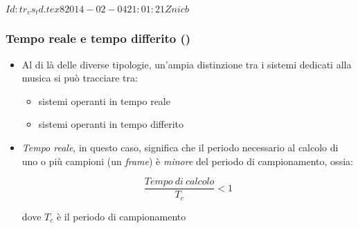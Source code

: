 %
%
%
%
%
\svnInfo $Id: tr_vs_td.tex 8 2014-02-04 21:01:21Z nicb $

\setcounter{ms}{0}
\begin{frame}
    \frametitle{Tempo reale e tempo differito ()}

	\begin{itemize}[<+- | alert@+->]

		\item Al di l\`a delle diverse tipologie,
		      un'ampia distinzione tra i sistemi dedicati alla musica
              si pu\`o tracciare tra:

			  \begin{itemize}[<+- | alert@+->]

				\item sistemi operanti in tempo reale

				\item sistemi operanti in tempo differito

			  \end{itemize}

		\item \emph{Tempo reale}, in questo caso, significa che
			  il periodo necessario al calcolo di uno o pi\`u campioni
			  (un \emph{frame}) \`e \emph{minore} del periodo di campionamento,
			  ossia:

			  \begin{equation}
				\frac{Tempo~di~calcolo}{T_c} < 1 \nonumber
			  \end{equation}

              dove $T_c$ \`e il periodo di campionamento

	\end{itemize}

\end{frame}

